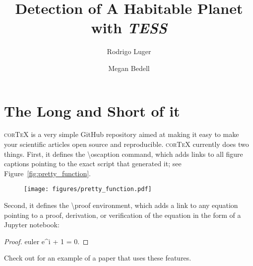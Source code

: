 \documentclass[modern]{aastex62}
\begin{document}
\title{Detection of A Habitable Planet with \emph{TESS}}

\author[0000-0002-0296-3826]{Rodrigo Luger}
%
\author[0000-0002-9328-5652]{Megan Bedell}

\section*{The Long and Short of it}
\label{sec:intro}
%
\textsc{corTeX} is a very simple \textsf{GitHub} repository aimed at making
it easy to make your scientific articles open source and reproducible.
\textsc{corTeX} currently does two things. First, it defines the
\textsf{\textbackslash oscaption} command, which adds
links to all figure captions pointing to the exact script that generated it;
see Figure~\ref{fig:pretty_function}.
%
\begin{figure}[h!]
    \begin{centering}
    \texttt{[image: figures/pretty\_function.pdf]}
    \end{centering}
\end{figure}
%

Second, it defines the \textsf{\textbackslash proof} environment, which
adds a link to any equation pointing to a proof, derivation, or
verification of the equation in the form of a \textsf{Jupyter} notebook:
%
\begin{proof}{euler}
    \label{eq:euler}
    e^{i\pi} + 1 = 0.
\end{proof}
%
Check out \citet{Luger2018} for an example of a paper that uses these
features.

\pagebreak

\end{document}
